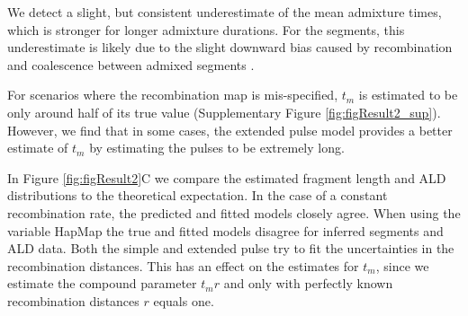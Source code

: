 \documentclass[11pt]{article}
\begin{document}
We detect a slight, but consistent underestimate of the mean admixture times, which is stronger for longer admixture durations. For the segments, this underestimate is likely due to the slight downward bias caused by recombination and coalescence between admixed segments \citep{liang_lengths_2014}. 

For scenarios where the recombination map is mis-specified,  $t_m$ is estimated to be only around half of its true value (Supplementary Figure \ref{fig:figResult2_sup}). However, we find that in some cases, the extended pulse model provides a better estimate of $t_m$ by estimating the pulses to be extremely long.

In Figure \ref{fig:figResult2}C we compare the estimated fragment length and ALD distributions to the theoretical expectation. In the case of a constant recombination rate, the predicted and fitted models closely agree. When using the variable HapMap the true and fitted models disagree for inferred segments and ALD data. Both the simple and extended pulse try to fit the uncertainties in the recombination distances. This has an effect on the estimates for $t_m$, since we estimate the compound parameter $t_m r$ and only with perfectly known recombination distances $r$ equals one.
\end{document}
